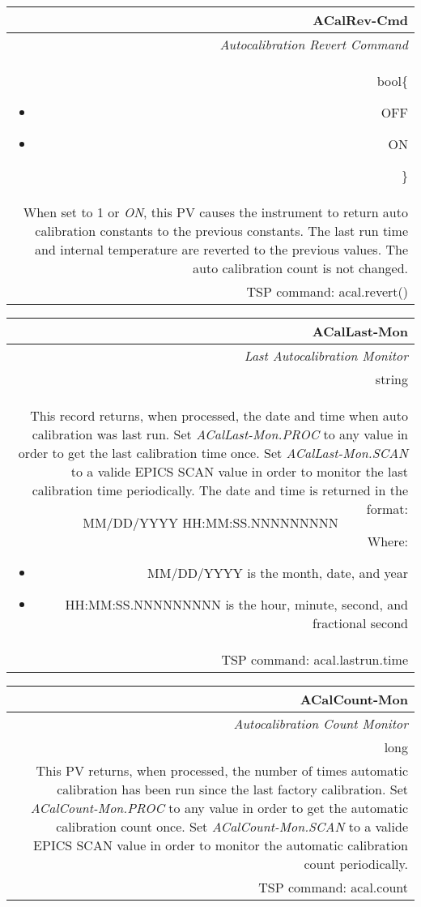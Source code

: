 \documentclass[openany]{article}
\begin{document}
		\begin{tabular}{N}
			\hline
			\bfseries ACalRev-Cmd\label{pv:acalrev-cmd} \\ \hline
			\emph{Autocalibration Revert Command} \\
			bool\{\begin{itemize}[noitemsep]
				\small
				\item[] OFF
				\item[] ON
			\end{itemize}\} \\
			When set to 1 or \emph{ON}, this PV causes the instrument to return auto calibration constants to the previous constants. The last run time and internal temperature are reverted to the previous values. The auto calibration
count is not changed. \\
			TSP command: acal.revert()
		\end{tabular}

		\begin{tabular}{N}
			\hline
			\bfseries ACalLast-Mon\label{pv:acallast-mon} \\ \hline
			\emph{Last Autocalibration Monitor} \\
			string \\
			This record returns, when processed, the date and time when auto calibration was last run. Set \emph{ACalLast-Mon.PROC} to any value in order to get the last calibration time once. Set \emph{ACalLast-Mon.SCAN} to a valide EPICS SCAN value in order to monitor the last calibration time periodically. The date and time is returned in the format: $$ \text{MM/DD/YYYY HH:MM:SS.NNNNNNNNN} $$ Where: \begin{itemize} \item MM/DD/YYYY is the month, date, and year \item HH:MM:SS.NNNNNNNNN is the hour, minute, second, and fractional second \end{itemize} \\
			TSP command: acal.lastrun.time
		\end{tabular}

		\begin{tabular}{N}
			\hline
			\bfseries ACalCount-Mon\label{pv:acalcount-mon} \\ \hline
			\emph{Autocalibration Count Monitor} \\
			long \\
			This PV returns, when processed, the number of times automatic calibration has been run since the last factory calibration. Set \emph{ACalCount-Mon.PROC} to any value in order to get the automatic calibration count once. Set \emph{ACalCount-Mon.SCAN} to a valide EPICS SCAN value in order to monitor the automatic calibration count periodically. \\
			TSP command: acal.count
		\end{tabular}
\end{document}
